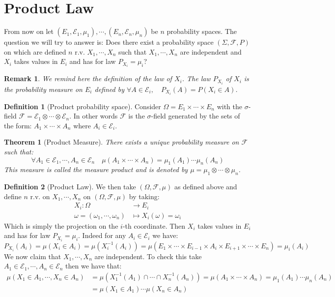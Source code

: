 \documentclass[10pt,a4paper]{book}
\newtheorem{theorem}{Theorem}[section]
\newtheorem*{remark}{Remark}
\theoremstyle{definition}
\newtheorem{definition}{Definition}[section]
\begin{document}
\section{Product Law}

From now on let $(E_1, \mathcal{E}_1, \mu_1), \cdots, (E_n, \mathcal{E}_n, \mu_n)$ be $n$ probability spaces. The question we will try to answer is: Does there exist a probability space $(\Sigma, \mathcal{F}, P)$ on which are defined $n$ r.v. $X_1, \cdots, X_n$ such that $X_1, \cdots, X_n$ are independent and $X_i$ takes values in $E_i$ and has for law $P_{X_i} = \mu_i$?

\begin{remark} We remind here the definition of the law of $X_i$. The law $P_{X_i}$ of $X_i$ is the probability measure on $E_i$ defined by $\forall A \in \mathcal{E}_i, \quad P_{X_i}(A) = P(X_i \in A)$. 
\end{remark}

\begin{definition}[Product probability space] Consider $\Omega = E_1 \times \cdots \times E_n$ with the $\sigma$-field $\mathcal{F} = \mathcal{E}_1 \otimes \cdots \otimes \mathcal{E}_n$. In other words $\mathcal{F}$ is the $\sigma$-field generated by the sets of the form: $A_1 \times \cdots \times A_n$ where $A_i \in \mathcal{E}_i$. 
\end{definition}

\begin{theorem} [Product Measure] There exists a unique probability measure on $\mathcal{F}$ such that: 
\[
\forall A_1 \in \mathcal{E}_1, \cdots, A_n \in \mathcal{E}_n \quad \mu(A_1 \times \cdots \times A_n) = \mu_1(A_1) \cdots \mu_n(A_n)
\]
This measure is called the measure product and is denoted by $\mu = \mu_1 \otimes \cdots \otimes \mu_n$. 
\end{theorem}

\begin{definition}[Product Law]
We then take $(\Omega, \mathcal{F}, \mu)$ as defined above and define $n$ r.v. on $X_1, \cdots, X_n$ on $(\Omega, \mathcal{F}, \mu)$ by taking:
\begin{align*}
X_i : \Omega &\longrightarrow E_i\\
\omega = (\omega_1, \cdots, \omega_n) &\longmapsto X_i(\omega) = \omega_i
\end{align*}
Which is simply the projection on the $i$-th coordinate. Then $X_i$ takes values in $E_i$ and has for law $P_{X_i} = \mu_i$. Indeed for any $A_i \in \mathcal{E}_i$ we have:
\[
P_{X_i}(A_i) = \mu(X_i \in A_i) = \mu (X_i^{-1}(A_i)) = \mu(E_1 \times \cdots \times E_{i - 1} \times A_i \times E_{i + 1} \times \cdots \times E_n) = \mu_i(A_i)
\]
We now claim that $X_1, \cdots, X_n$ are independent. To check this take $A_1 \in \mathcal{E}_1, \cdots, A_n \in \mathcal{E}_n$ then we have that:
\begin{align*}
\mu(X_1 \in A_1, \cdots, X_n \in A_n) &= \mu(X_{1}^{-1}(A_1) \cap \cdots \cap X_n^{-1}(A_n)) = \mu(A_1 \times \cdots \times A_n) = \mu_1(A_1) \cdots \mu_n(A_n) \\
&= \mu(X_1 \in A_1) \cdots \mu(X_n \in A_n)
\end{align*}
\end{definition}
\end{document}
